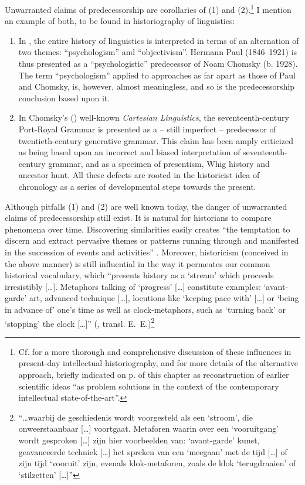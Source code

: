 \documentclass[output=paper]{langscibook}
\begin{document}
Unwarranted claims of predecessorship are corollaries of (1) and (2).\footnote{Cf. \citet[chaps. 2 \& 3]{Elffers1991} for a more thorough and comprehensive discussion of these influences in present-day intellectual historiography, and for more details of the alternative approach, briefly indicated on p. \pageref{q:elffers:probsols} of this chapter as reconstruction of earlier scientific ideas ``as problem solutions in the context of the contemporary intellectual state-of-the-art''.} I mention an example of both, to be found in historiography of linguistics:

\begin{enumerate}

\item[Ad 1.] In \citet{Antal1984}, the entire history of linguistics is interpreted in terms of an alternation of  two themes: ``psychologism'' and ``objectivism''. Hermann Paul (1846–1921) is thus presented as a ``psychologistic'' predecessor of Noam Chomsky (b. 1928). The term ``psychologism'' applied to approaches as far apart as those of Paul and Chomsky, is, however, almost meaningless, and so is the predecessorship conclusion based upon it.

\item[Ad 2.] In Chomsky’s (\citeyear{Chomsky20091966}) well-known \emph{Cartesian Linguistics}, the seventeenth-century Port-Royal Grammar is presented as a – still imperfect – predecessor of twentieth-century generative grammar. This claim has been amply criticized as being based upon an incorrect and biased interpretation of seven\-teenth-century grammar, and as a specimen of presentism, Whig history and ancestor hunt. All these defects are rooted in the historicist idea of chronology as a series of developmental steps towards the present. 

\end{enumerate}

Although pitfalls (1) and (2) are well known today, the danger of unwarranted claims of predecessorship still exist. It is natural for historians to compare phenomena over time. Discovering similarities easily creates ``the temptation to discern and extract pervasive themes or patterns running through and manifested in the succession of events and activities'' \citep[7-8]{Robins1997}. Moreover, historicism (conceived in the above manner) is still influential in the way it permeates our common historical vocabulary, which ``presents history as a `stream' which proceeds irresistibly […]. Metaphors talking of `progress' […] constitute examples: `avant-garde' art, advanced technique […], locutions like `keeping pace with' […] or `being in advance of' one's time as well as clock-metaphors, such as `turning back' or `stopping' the clock […]'' (\citealt[131]{Dussen1986}, transl. E.~E.)\footnote{``…waarbij de geschiedenis wordt voorgesteld als een `stroom', die onweerstaanbaar […] voortgaat. Metaforen waarin over een `vooruitgang' wordt gesproken […] zijn hier voorbeelden van: `avant-garde' kunst, geavanceerde techniek […] het spreken van een `meegaan' met de tijd […] of zijn tijd `vooruit' zijn, evenals klok-metaforen, zoals de klok `terugdraaien' of `stilzetten' […]''}
\end{document}

